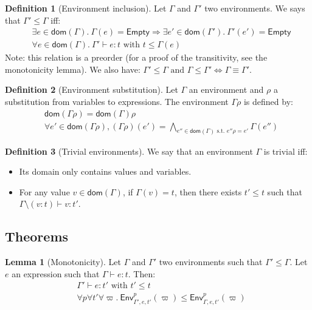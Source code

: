 \documentclass[a4paper]{article}%
\newcommand{\dom}[1]{\textsf{dom}(#1)}
\newcommand{\Empty} {\textsf{Empty}}%
\newcommand{\Gp}[2]{\textsf{Env}^{#1}_{#2}}
\theoremstyle{definition}
\newtheorem{lemma}{Lemma}
\newtheorem{definition}{Definition}
\begin{document}
  \begin{definition}[Environment inclusion]
    Let $\Gamma$ and $\Gamma'$ two environments. We says that $\Gamma' \leq \Gamma$ iff:
    \begin{align*}
      &\exists e\in \dom \Gamma.\ \Gamma(e)=\Empty \Rightarrow \exists e'\in \dom {\Gamma'}.\ \Gamma'(e')=\Empty\\
      &\forall e \in \dom \Gamma.\ \Gamma' \vdash e : t \text{ with } t \leq \Gamma(e)
    \end{align*}
    Note: this relation is a preorder (for a proof of the transitivity, see the monotonicity lemma).
    We also have: $\Gamma' \leq \Gamma \text{ and } \Gamma \leq \Gamma' \Leftrightarrow \Gamma \equiv \Gamma'$.
  \end{definition}

  \begin{definition}[Environment substitution]
    Let $\Gamma$ an environment and $\rho$ a substitution from variables to expressions.
    The environment $\Gamma\rho$ is defined by:
    \begin{align*}
      &\dom {\Gamma\rho} = \dom \Gamma \rho\\
      &\forall e' \in \dom {\Gamma\rho}, (\Gamma\rho)(e') = \bigwedge_{e'' \in \dom \Gamma \text{ s.t. } e''\rho=e'}\Gamma(e'')
    \end{align*}
  \end{definition}

  \begin{definition}[Trivial environments]
    We say that an environment $\Gamma$ is trivial iff:
    \begin{itemize}
      \item Its domain only contains values and variables.
      \item For any value $v \in \dom \Gamma$, if $\Gamma(v)=t$, then there exists $t' \leq t$
      such that $\Gamma \setminus (v:t) \vdash v : t'$.
    \end{itemize}
  \end{definition}

    \subsection{Theorems}

    \begin{lemma}[Monotonicity]
      Let $\Gamma$ and $\Gamma'$ two environments such that $\Gamma' \leq \Gamma$. Let $e$ an expression such that $\Gamma \vdash e:t$.
      Then:\\
      \begin{align*}
        &\Gamma' \vdash e:t' \text{ with } t' \leq t\\
        &\forall p \forall t' \forall \varpi.\ \Gp p {\Gamma',e,t'} (\varpi) \leq \Gp p {\Gamma,e,t'} (\varpi)
      \end{align*}
    \end{lemma}
\end{document}
